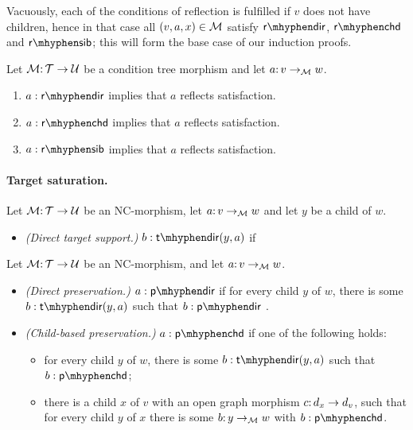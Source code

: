 Vacuously, each of the conditions of reflection is fulfilled if $v$ does not have children, hence in that case all $(v,a,x)\in {\mathcal{M}}$ satisfy $\rdir$, $\rchd$ and $\rsib$; this will form the base case of our induction proofs.

\begin{lemma}\label{lem:source-saturation}
Let ${\mathcal{M}}{:}\,{\mathcal{T}}\rightarrow{\mathcal{U}}$ be a condition tree morphism and let $a{:}\, v\rightarrow_{\mathcal{M}} w$.
\begin{enumerate}[topsep=\smallskipamount]
\item $a:\rdir$ implies that $a$ reflects satisfaction. 
\item $a:\rchd$ implies that $a$ reflects satisfaction. 
\item $a:\rsib$ implies that $a$ reflects satisfaction. 
\end{enumerate}
\end{lemma}

\paragraph{Target saturation.}

\begin{definition}\label{def:target support}
Let ${\mathcal{M}}{:}\, {\mathcal{T}}\rightarrow{\mathcal{U}}$ be an NC-morphism, let $a{:}\, v\rightarrow_{\mathcal{M}} w$ and let $y$ be a child of $w$.
\begin{itemize}[topsep=\smallskipamount]
\item \emph{(Direct target support.)} $b:\tdir(y,a)$ if 
\end{itemize}
\end{definition}

\begin{definition}
Let ${\mathcal{M}}{:}\, {\mathcal{T}}\rightarrow{\mathcal{U}}$ be an NC-morphism, and let $a{:}\, v\rightarrow_{\mathcal{M}} w$.
\begin{itemize}[topsep=\smallskipamount]
\item \emph{(Direct preservation.)} $a:\pdir$ if for every child $y$ of $w$, there is some $b:\tdir(y,a)$ such that $b:\pdir$ .
\item \emph{(Child-based preservation.)} $a:\pchd$ if one of the following holds:
\begin{itemize}
\item for every child $y$ of $w$, there is some $b:\tdir(y,a)$ such that $b:\pchd$;
\item there is a child $x$ of $v$ with an open graph morphism $c{:}\, d_x\rightarrow d_v$, such that for every child $y$ of $x$ there is some $b{:}\, y \rightarrow_{\mathcal{M}} w$ with $b:\pchd$.
\end{itemize}
\end{itemize}
\end{definition}

